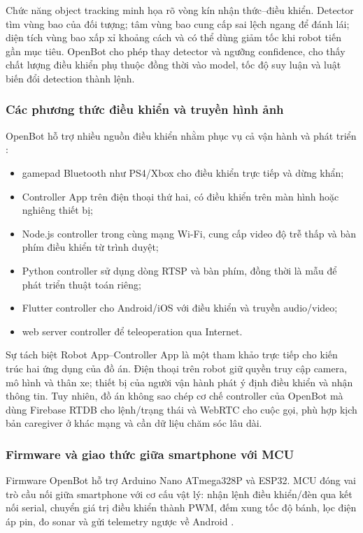 Chức năng object tracking minh họa rõ vòng kín nhận thức--điều khiển. Detector tìm vùng bao của đối tượng; tâm vùng bao cung cấp sai lệch ngang để đánh lái; diện tích vùng bao xấp xỉ khoảng cách và có thể dùng giảm tốc khi robot tiến gần mục tiêu. OpenBot cho phép thay detector và ngưỡng confidence, cho thấy chất lượng điều khiển phụ thuộc đồng thời vào model, tốc độ suy luận và luật biến đổi detection thành lệnh.

\subsubsection{Các phương thức điều khiển và truyền hình ảnh}

OpenBot hỗ trợ nhiều nguồn điều khiển nhằm phục vụ cả vận hành và phát triển :

\begin{itemize}
    \item gamepad Bluetooth như PS4/Xbox cho điều khiển trực tiếp và dừng khẩn;
    \item Controller App trên điện thoại thứ hai, có điều khiển trên màn hình hoặc nghiêng thiết bị;
    \item Node.js controller trong cùng mạng Wi-Fi, cung cấp video độ trễ thấp và bàn phím điều khiển từ trình duyệt;
    \item Python controller sử dụng dòng RTSP và bàn phím, đồng thời là mẫu để phát triển thuật toán riêng;
    \item Flutter controller cho Android/iOS với điều khiển và truyền audio/video;
    \item web server controller để teleoperation qua Internet.
\end{itemize}

Sự tách biệt Robot App--Controller App là một tham khảo trực tiếp cho kiến trúc hai ứng dụng của đồ án. Điện thoại trên robot giữ quyền truy cập camera, mô hình và thân xe; thiết bị của người vận hành phát ý định điều khiển và nhận thông tin. Tuy nhiên, đồ án không sao chép cơ chế controller của OpenBot mà dùng Firebase RTDB cho lệnh/trạng thái và WebRTC cho cuộc gọi, phù hợp kịch bản caregiver ở khác mạng và cần dữ liệu chăm sóc lâu dài.

\subsubsection{Firmware và giao thức giữa smartphone với MCU}

Firmware OpenBot hỗ trợ Arduino Nano ATmega328P và ESP32. MCU đóng vai trò cầu nối giữa smartphone với cơ cấu vật lý: nhận lệnh điều khiển/đèn qua kết nối serial, chuyển giá trị điều khiển thành PWM, đếm xung tốc độ bánh, lọc điện áp pin, đo sonar và gửi telemetry ngược về Android .

